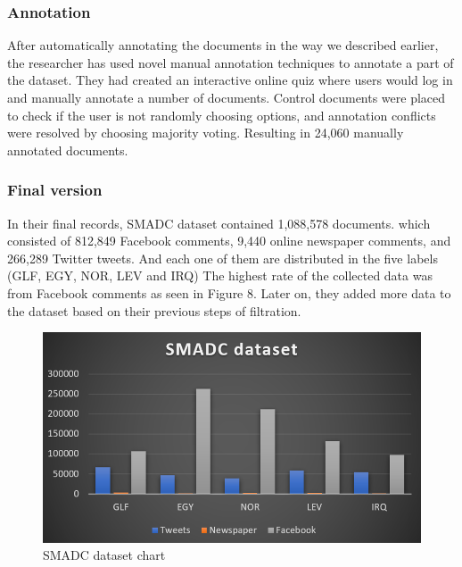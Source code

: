 \documentclass[12pt]{diazessay}
\begin{document}
                \subsubsection{Annotation} 
                \label{txt:annotation}    
                After automatically annotating the documents in the way we described earlier, the researcher has used novel manual annotation techniques to annotate a part of the dataset. They had created an interactive online quiz where users would log in and manually annotate a number of documents. Control documents were placed to check if the user is not randomly choosing options, and annotation conflicts were resolved by choosing majority voting. Resulting in 24,060 manually annotated documents. \cite{alshutayri}
                
                \subsubsection{Final version}
                In their final records, SMADC dataset contained 1,088,578 documents. which consisted of 812,849 Facebook comments, 9,440 online newspaper comments, and 266,289 Twitter tweets\cite{alshutayri}. And each one of them are distributed in the five labels (GLF, EGY, NOR, LEV and IRQ) The highest rate of the collected data was from Facebook comments as seen in Figure 8. Later on, they added more data to the dataset based on their previous steps of filtration.
                \begin{figure}[h]
                    \centering
                    \includegraphics[scale=0.85]{Figures/SMADC dataset chart.PNG}
                    \caption{SMADC dataset chart}
                    \label{fig:cmp}
                \end{figure}
                
\end{document}
